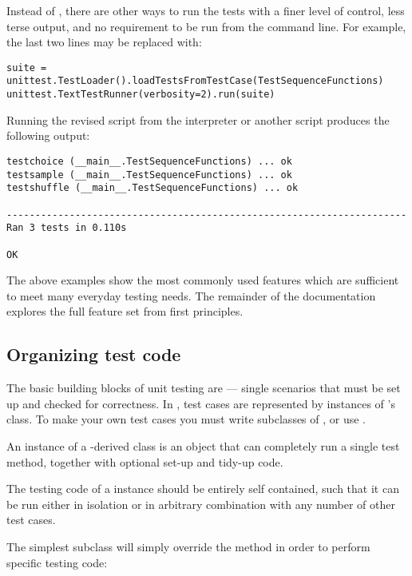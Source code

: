 Instead of , there are other ways to run the tests
with a finer level of control, less terse output, and no requirement to be
run from the command line.  For example, the last two lines may be replaced
with:

\begin{verbatim}
suite = unittest.TestLoader().loadTestsFromTestCase(TestSequenceFunctions)
unittest.TextTestRunner(verbosity=2).run(suite)
\end{verbatim}

Running the revised script from the interpreter or another script
produces the following output:

\begin{verbatim}
testchoice (__main__.TestSequenceFunctions) ... ok
testsample (__main__.TestSequenceFunctions) ... ok
testshuffle (__main__.TestSequenceFunctions) ... ok

----------------------------------------------------------------------
Ran 3 tests in 0.110s

OK
\end{verbatim}

The above examples show the most commonly used  features
which are sufficient to meet many everyday testing needs.  The remainder
of the documentation explores the full feature set from first principles.


\subsection{Organizing test code
            \label{organizing-tests}}

The basic building blocks of unit testing are  ---
single scenarios that must be set up and checked for correctness.  In
, test cases are represented by instances of
's  class. To make
your own test cases you must write subclasses of , or
use .

An instance of a -derived class is an object that can
completely run a single test method, together with optional set-up
and tidy-up code.

The testing code of a  instance should be entirely
self contained, such that it can be run either in isolation or in
arbitrary combination with any number of other test cases.

The simplest  subclass will simply override the
 method in order to perform specific testing code:

